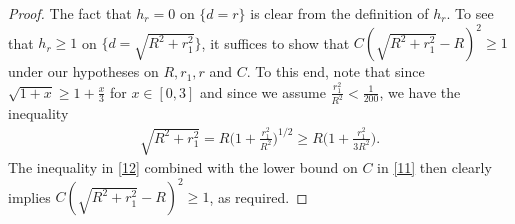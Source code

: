 \documentclass[12pt]{article}
\numberwithin{equation}{section}
\theoremstyle{plain}
\theoremstyle{definition}
\begin{document}
\begin{proof}
	The fact that $h_r = 0$ on $\{d=r\}$ is clear from the definition of $h_r$. To see that $h_r \geq 1$ on $\{d=\sqrt{R^2+r_1^2}\}$, it suffices to show that $C(\sqrt{R^2 + r_1^2} - R)^2 \geq 1$ under our hypotheses on $R, r_1, r$ and $C$. To this end, note that since $\sqrt{1+x} \geq 1 + \frac{x}{3}$ for $x\in[0,3]$ and since we assume $\frac{r_1^2}{R^2}< \frac{1}{200}$, we have the inequality
	\begin{align}\label{12}
	\sqrt{R^2 + r_1^2} = R\bigg(1+ \frac{r_1^2}{R^2}\bigg)^{1/2} \geq R\bigg(1+\frac{r_1^2}{3R^2}\bigg).
	\end{align}
	The inequality in \eqref{12} combined with the lower bound on $C$ in \eqref{11} then clearly implies $C(\sqrt{R^2 + r_1^2} - R)^2 \geq 1$, as required.\medskip 
	
	
	

\end{proof}
\end{document}
